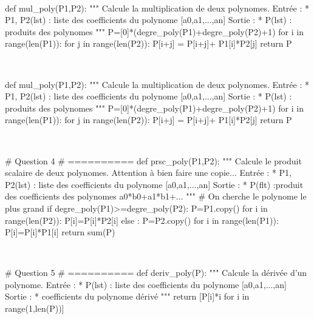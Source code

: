 \documentclass[10pt,fleqn]{article} %
\begin{document}
\begin{corrige}
$\quad$
\begin{python}
def mul_poly(P1,P2):
    """
    Calcule la multiplication de deux polynomes.
    Entrée : 
     * P1, P2(lst) : liste des coefficients du 
       polynome [a0,a1,...,an]
    Sortie : 
     * P(lst) : produits des polynomes
    """
    P=[0]*(degre_poly(P1)+degre_poly(P2)+1)
    for i in range(len(P1)):
        for j in range(len(P2)):
           P[i+j] = P[i+j]+ P1[i]*P2[j]
    return P
\end{python}
\end{corrige}

\begin{corrige}
$\quad$
\begin{python}
def mul_poly(P1,P2):
    """
    Calcule la multiplication de deux polynomes.
    Entrée : 
     * P1, P2(lst) : liste des coefficients du 
        polynome [a0,a1,...,an]
    Sortie : 
     * P(lst) : produits des polynomes
    """
    P=[0]*(degre_poly(P1)+degre_poly(P2)+1)
    for i in range(len(P1)):
        for j in range(len(P2)):
           P[i+j] = P[i+j]+ P1[i]*P2[j]
    return P
\end{python}
\end{corrige}



\begin{corrige}
$\quad$
\begin{python}
# Question 4
# ==========
def prsc_poly(P1,P2):
    """
    Calcule le produit scalaire de deux polynomes.
    Attention à bien faire une copie...
    Entrée : 
     * P1, P2(lst) : liste des coefficients du 
       polynome [a0,a1,...,an]
    Sortie : 
     * P(flt) :produit des coefficients des 
        polynomes a0*b0+a1*b1+...
    """
     # On cherche le polynome le plus grand
    if degre_poly(P1)>=degre_poly(P2):
        P=P1.copy()
        for i in range(len(P2)):
            P[i]=P[i]*P2[i]
    else :
        P=P2.copy()
        for i in range(len(P1)):
            P[i]=P[i]*P1[i]
    return sum(P)
\end{python}
\end{corrige}

\begin{corrige}
$\quad$
\begin{python}
# Question 5
# ==========
def deriv_poly(P):
    """
    Calcule la dérivée d'un polynome.
    Entrée : 
     * P(lst) : liste des coefficients du 
        polynome [a0,a1,...,an]
    Sortie : 
     * coefficients du polynome dérivé
    """
    return [P[i]*i for i in range(1,len(P))]
\end{python}
\end{corrige}
\end{document}

